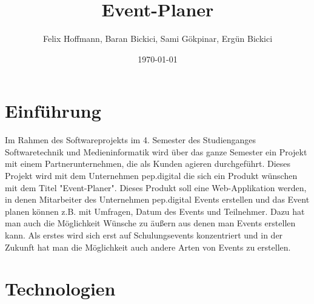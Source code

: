 \documentclass[a4paper,12pt]{article}
\begin{document}

\title{Event-Planer}
\author{Felix Hoffmann, Baran Bickici, Sami Gökpinar, Ergün Bickici}
\date{\today}
\maketitle

\newpage


\tableofcontents

\newpage

\listoffigures

\newpage

\listoftables

\newpage


\section{Einführung}
Im Rahmen des Softwareprojekts im 4. Semester des Studienganges Softwaretechnik und Medieninformatik wird über das ganze Semester ein Projekt mit einem Partnerunternehmen, die als Kunden agieren durchgeführt. Dieses Projekt wird mit dem Unternehmen pep.digital die sich ein Produkt wünschen mit dem Titel "Event-Planer". Dieses Produkt soll eine Web-Applikation werden, in denen Mitarbeiter des Unternehmen pep.digital Events erstellen und das Event planen können z.B. mit Umfragen, Datum des Events und Teilnehmer. Dazu hat man auch die Möglichkeit Wünsche zu äußern aus denen man Events erstellen kann. Als erstes wird sich erst auf Schulungsevents konzentriert und in der Zukunft hat man die Möglichkeit auch andere Arten von Events zu erstellen.


\section{Technologien}
\end{document}
